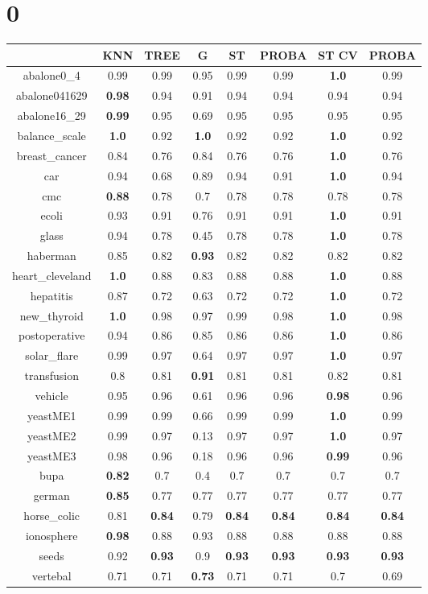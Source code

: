 \documentclass{article}%
\begin{document}
%
\normalsize%
\section*{0}%
\begin{tabular}{c|ccccccc}%
\hline%
&KNN&TREE&G&ST&PROBA&ST CV&PROBA\\%
\hline%
abalone0\_4&0.99&0.99&0.95&0.99&0.99&\textbf{1.0}&0.99\\%
\hline%
abalone041629&\textbf{0.98}&0.94&0.91&0.94&0.94&0.94&0.94\\%
\hline%
abalone16\_29&\textbf{0.99}&0.95&0.69&0.95&0.95&0.95&0.95\\%
\hline%
balance\_scale&\textbf{1.0}&0.92&\textbf{1.0}&0.92&0.92&\textbf{1.0}&0.92\\%
\hline%
breast\_cancer&0.84&0.76&0.84&0.76&0.76&\textbf{1.0}&0.76\\%
\hline%
car&0.94&0.68&0.89&0.94&0.91&\textbf{1.0}&0.94\\%
\hline%
cmc&\textbf{0.88}&0.78&0.7&0.78&0.78&0.78&0.78\\%
\hline%
ecoli&0.93&0.91&0.76&0.91&0.91&\textbf{1.0}&0.91\\%
\hline%
glass&0.94&0.78&0.45&0.78&0.78&\textbf{1.0}&0.78\\%
\hline%
haberman&0.85&0.82&\textbf{0.93}&0.82&0.82&0.82&0.82\\%
\hline%
heart\_cleveland&\textbf{1.0}&0.88&0.83&0.88&0.88&\textbf{1.0}&0.88\\%
\hline%
hepatitis&0.87&0.72&0.63&0.72&0.72&\textbf{1.0}&0.72\\%
\hline%
new\_thyroid&\textbf{1.0}&0.98&0.97&0.99&0.98&\textbf{1.0}&0.98\\%
\hline%
postoperative&0.94&0.86&0.85&0.86&0.86&\textbf{1.0}&0.86\\%
\hline%
solar\_flare&0.99&0.97&0.64&0.97&0.97&\textbf{1.0}&0.97\\%
\hline%
transfusion&0.8&0.81&\textbf{0.91}&0.81&0.81&0.82&0.81\\%
\hline%
vehicle&0.95&0.96&0.61&0.96&0.96&\textbf{0.98}&0.96\\%
\hline%
yeastME1&0.99&0.99&0.66&0.99&0.99&\textbf{1.0}&0.99\\%
\hline%
yeastME2&0.99&0.97&0.13&0.97&0.97&\textbf{1.0}&0.97\\%
\hline%
yeastME3&0.98&0.96&0.18&0.96&0.96&\textbf{0.99}&0.96\\%
\hline%
bupa&\textbf{0.82}&0.7&0.4&0.7&0.7&0.7&0.7\\%
\hline%
german&\textbf{0.85}&0.77&0.77&0.77&0.77&0.77&0.77\\%
\hline%
horse\_colic&0.81&\textbf{0.84}&0.79&\textbf{0.84}&\textbf{0.84}&\textbf{0.84}&\textbf{0.84}\\%
\hline%
ionosphere&\textbf{0.98}&0.88&0.93&0.88&0.88&0.88&0.88\\%
\hline%
seeds&0.92&\textbf{0.93}&0.9&\textbf{0.93}&\textbf{0.93}&\textbf{0.93}&\textbf{0.93}\\%
\hline%
vertebal&0.71&0.71&\textbf{0.73}&0.71&0.71&0.7&0.69\\%
\hline%
\end{tabular}
\end{document}
